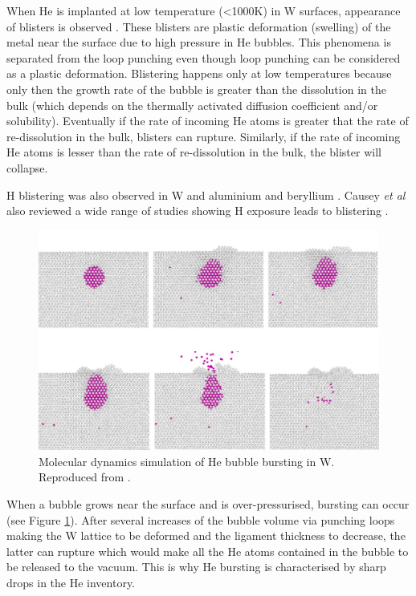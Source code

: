 When He is implanted at low temperature (<1000K) in W surfaces, appearance of blisters is observed .
These blisters are plastic deformation (swelling) of the metal near the surface due to high pressure in He bubbles.
This phenomena is separated from the loop punching even though loop punching can be considered as a plastic deformation.
Blistering happens only at low temperatures because only then the growth rate of the bubble is greater than the dissolution in the bulk (which depends on the thermally activated diffusion coefficient and/or solubility).
Eventually if the rate of incoming He atoms is greater that the rate of re-dissolution in the bulk, blisters can rupture.
Similarly, if the rate of incoming He atoms is lesser than the rate of re-dissolution in the bulk, the blister will collapse.

H blistering was also observed in W  and aluminium and beryllium .
Causey \textit{et al} also reviewed a wide range of studies showing H exposure leads to blistering .


\begin{figure} [h!]
    \centering
    \includegraphics[width=\linewidth]{Figures/Chapter1/bubble_bursting_zhou.jpg}
    \caption{Molecular dynamics simulation of He bubble bursting in W. Reproduced from \cite{zhou_growth_2019}.}
    \label{fig: bubble bursting zhou}
\end{figure}

When a bubble grows near the surface and is over-pressurised, bursting can occur (see Figure \ref{fig: bubble bursting zhou}).
After several increases of the bubble volume via punching loops making the W lattice to be deformed and the ligament thickness to decrease, the latter can rupture which would make all the He atoms contained in the bubble to be released to the vacuum.
This is why He bursting is characterised by sharp drops in the He inventory.

